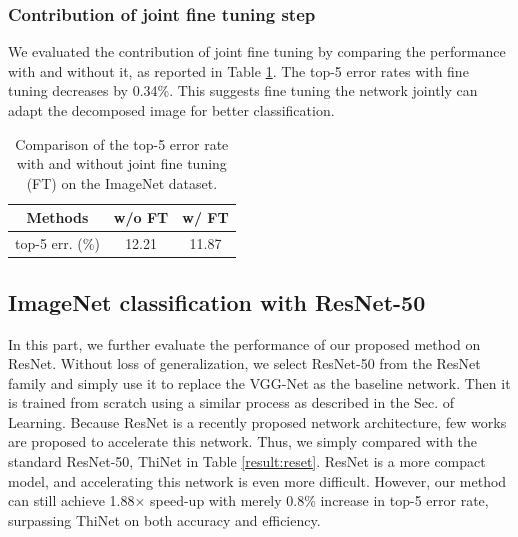 \documentclass[letterpaper]{article} %
\begin{document}


\subsubsection{Contribution of joint fine tuning step}
We evaluated the contribution of joint fine tuning by comparing the performance with and without it, as reported in Table \ref{table:ft}. The top-5 error rates with fine tuning decreases by 0.34\%. This suggests fine tuning the network jointly can adapt the decomposed image for better classification.

\begin{table}[htbp]
\centering
\begin{tabular}{c|c|c}
\hline
\centering  Methods  & w/o FT & w/ FT\\
\hline
\hline
top-5 err. (\%) & 12.21 & 11.87 \\
\hline
\end{tabular}
\caption{Comparison of the top-5 error rate with and without joint fine tuning (FT) on the ImageNet dataset.}
\label{table:ft}
\end{table}

\subsection{ImageNet classification with ResNet-50}
In this part, we further evaluate the performance of our proposed method on ResNet. Without loss of generalization, we select ResNet-50 from the ResNet family and simply use it to replace the VGG-Net as the baseline network. Then it is trained from scratch using a similar process as described in the Sec. of Learning. Because ResNet is a recently proposed network architecture, few works are proposed to accelerate this network. Thus, we simply compared with the standard ResNet-50, ThiNet in Table \ref{result:reset}. ResNet is a more compact model, and accelerating this network is even more difficult. However, our method can still achieve 1.88$\times$ speed-up with merely 0.8\% increase in top-5 error rate, surpassing ThiNet on both accuracy and efficiency.
\end{document}
